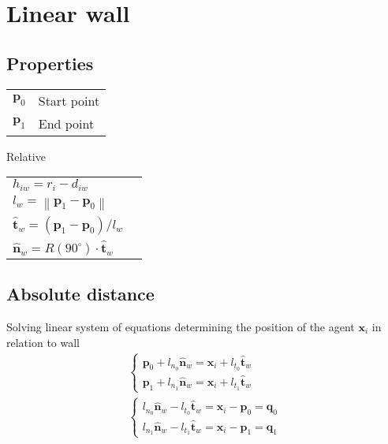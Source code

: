 \section{Linear wall}
\subsection{Properties}
\begin{table}[H]
\begin{tabular}{ll}
$ \mathbf{p}_{0} $ & Start point \\
$ \mathbf{p}_{1} $ & End point \\
\end{tabular}
\end{table}
Relative
\begin{table}[H]
\begin{tabular}{ll}
$ h_{iw} = r_{i} - d_{iw} $ & \\
$ l_{w} = \left\|\mathbf{p}_{1} - \mathbf{p}_{0}\right\| $ & \\
$ \hat{\mathbf{t}}_{w} = \left(\mathbf{p}_{1} - \mathbf{p}_{0}\right) / l_{w} $ & \\
$ \hat{\mathbf{n}}_{w} = R(90^{\circ}) \cdot \hat{\mathbf{t}}_{w} $ & \\
\end{tabular}
\end{table}

\subsection{Absolute distance}
Solving linear system of equations determining the position of the agent $ \mathbf{x}_{i} $ in relation to wall
\begin{align}
\begin{cases}
\mathbf{p}_{0} + l_{n_0} \hat{\mathbf{n}}_{w} = \mathbf{x}_{i} + l_{t_0} \hat{\mathbf{t}}_{w} \\
\mathbf{p}_{1} + l_{n_1} \hat{\mathbf{n}}_{w} = \mathbf{x}_{i} + l_{t_1} \hat{\mathbf{t}}_{w}
\end{cases} 
\\
\begin{cases}
l_{n_0} \hat{\mathbf{n}}_{w} - l_{t_0} \hat{\mathbf{t}}_{w} = \mathbf{x}_{i} - \mathbf{p}_{0} =  \mathbf{q}_{0} \\
l_{n_1} \hat{\mathbf{n}}_{w} - l_{t_1} \hat{\mathbf{t}}_{w} = \mathbf{x}_{i} - \mathbf{p}_{1} = \mathbf{q}_{1}
\end{cases}
\end{align}

